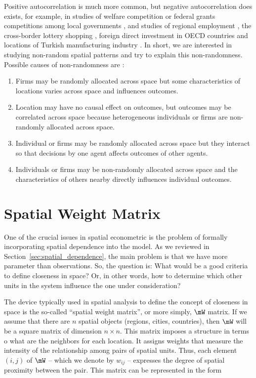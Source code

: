 \documentclass[english,12pt]{book}\usepackage[]{graphicx}\usepackage[]{xcolor}
\begin{document}
Positive autocorrelation is much more common, but negative autocorrelation does exists, for example, in studies of welfare competition or federal grants competitions among local governments \citep{saavedra2000model, boarnet2002federal}, and studies of regional employment \citep{filiztekin2009regional, pavlyuk2011spatial}, the cross-border lottery shopping \citep{garrett2002revenue}, foreign direct investment in OECD countries \citep{garretsen2009fdi} and locations of Turkish manufacturing industry \citep{basdas2009spatial}. In short, we are interested in studying non-random spatial patterns and try to explain this non-randomness. Possible causes of non-randomness are \citep{gibbons2015spatial}:

\begin{enumerate}
	\item Firms may be randomly allocated across space but some characteristics of locations varies across space and influences outcomes. 
	\item Location may have no causal effect on outcomes, but outcomes may be correlated across space because heterogeneous individuals or firms are non-randomly allocated across space. 
	\item Individual or firms may be randomly allocated across  space but they interact so that decisions by one agent affects outcomes of other agents. 
	\item Individuals or firms may be non-randomly allocated across space and the characteristics of others nearby directly influences individual outcomes. 
\end{enumerate}


\section{Spatial Weight Matrix}

One of the crucial issues in spatial econometric is the problem of formally incorporating spatial dependence into the model. As we reviewed in Section~\ref{sec:spatial_dependence}, the main problem is that we have more parameter than observations. So, the question is: What would be a good criteria to define closeness in space? Or, in other words, how to determine which other units in the system influence the one under consideration?

The device typically used in spatial analysis to define the concept of closeness in space is the so-called ``spatial weight matrix'', or more simply, $\mW$ matrix. If we assume that there are $n$ spatial objects (regions, cities, countries), then $\mW$ will be a square matrix of dimension $n \times n$. This matrix imposes a structure in terms o what are the neighbors for each location. It assigns weights that measure the intensity of the relationship among pairs of spatial units. Thus, each element $(i,j)$ of $\mW$ -- which we denote by $w_{ij}$ -- expresses the degree of spatial proximity between the pair. This matrix can be represented in the form
\end{document}
